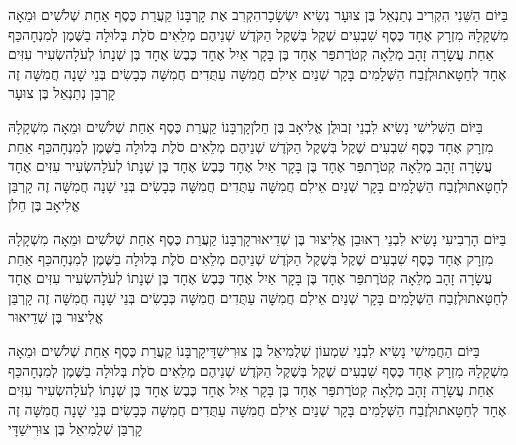 \documentclass[../main/main.tex]{subfiles}
\begin{document}
\begin{multicols}{\ncols}
בַּיּוֹם הַשֵּׁנִי הִקְרִיב נְתַנְאֵל בֶּן צוּעָר נְשִׂיא יִשְׂשָׂכָר\PreVerseSpace{}הִקְרִב אֶת קָרְבָּנוֹ קַעֲרַת כֶּסֶף אַחַת שְׁלֹשִׁים וּמֵאָה מִשְׁקָלָהּ מִזְרָק אֶחָד כֶּסֶף שִׁבְעִים שֶׁקֶל בְּשֶׁקֶל הַקֹּדֶשׁ שְׁנֵיהֶם מְלֵאִים סֹלֶת בְּלוּלָה בַשֶּׁמֶן לְמִנְחָה\PreVerseSpace{}כַּף אַחַת עֲשָׂרָה זָהָב מְלֵאָה קְטֹרֶת\PreVerseSpace{}פַּר אֶחָד בֶּן בָּקָר אַיִל אֶחָד כֶּבֶשׂ אֶחָד בֶּן שְׁנָתוֹ לְעֹלָה\PreVerseSpace{}שְׂעִיר עִזִּים אֶחָד לְחַטָּאת\PreVerseSpace{}וּלְזֶבַח הַשְּׁלָמִים בָּקָר שְׁנַיִם אֵילִם חֲמִשָּׁה עַתֻּדִים חֲמִשָּׁה כְּבָשִׂים בְּנֵי שָׁנָה חֲמִשָּׁה זֶה קָרְבַּן נְתַנְאֵל בֶּן צוּעָר\OpenSection{}\par
{}בַּיּוֹם הַשְּׁלִישִׁי נָשִׂיא לִבְנֵי זְבוּלֻן אֱלִיאָב בֶּן חֵלֹן\PreVerseSpace{}קָרְבָּנוֹ קַעֲרַת כֶּסֶף אַחַת שְׁלֹשִׁים וּמֵאָה מִשְׁקָלָהּ מִזְרָק אֶחָד כֶּסֶף שִׁבְעִים שֶׁקֶל בְּשֶׁקֶל הַקֹּדֶשׁ שְׁנֵיהֶם מְלֵאִים סֹלֶת בְּלוּלָה בַשֶּׁמֶן לְמִנְחָה\PreVerseSpace{}כַּף אַחַת עֲשָׂרָה זָהָב מְלֵאָה קְטֹרֶת\PreVerseSpace{}פַּר אֶחָד בֶּן בָּקָר אַיִל אֶחָד כֶּבֶשׂ אֶחָד בֶּן שְׁנָתוֹ לְעֹלָה\PreVerseSpace{}שְׂעִיר עִזִּים אֶחָד לְחַטָּאת\PreVerseSpace{}וּלְזֶבַח הַשְּׁלָמִים בָּקָר שְׁנַיִם אֵילִם חֲמִשָּׁה עַתֻּדִים חֲמִשָּׁה כְּבָשִׂים בְּנֵי שָׁנָה חֲמִשָּׁה זֶה קָרְבַּן אֱלִיאָב בֶּן חֵלֹן\OpenSection{}\par
{}בַּיּוֹם הָרְבִיעִי נָשִׂיא לִבְנֵי רְאוּבֵן אֱלִיצוּר בֶּן שְׁדֵיאוּר\PreVerseSpace{}קָרְבָּנוֹ קַעֲרַת כֶּסֶף אַחַת שְׁלֹשִׁים וּמֵאָה מִשְׁקָלָהּ מִזְרָק אֶחָד כֶּסֶף שִׁבְעִים שֶׁקֶל בְּשֶׁקֶל הַקֹּדֶשׁ שְׁנֵיהֶם מְלֵאִים סֹלֶת בְּלוּלָה בַשֶּׁמֶן לְמִנְחָה\PreVerseSpace{}כַּף אַחַת עֲשָׂרָה זָהָב מְלֵאָה קְטֹרֶת\PreVerseSpace{}פַּר אֶחָד בֶּן בָּקָר אַיִל אֶחָד כֶּבֶשׂ אֶחָד בֶּן שְׁנָתוֹ לְעֹלָה\PreVerseSpace{}שְׂעִיר עִזִּים אֶחָד לְחַטָּאת\PreVerseSpace{}וּלְזֶבַח הַשְּׁלָמִים בָּקָר שְׁנַיִם אֵילִם חֲמִשָּׁה עַתֻּדִים חֲמִשָּׁה כְּבָשִׂים בְּנֵי שָׁנָה חֲמִשָּׁה זֶה קָרְבַּן אֱלִיצוּר בֶּן שְׁדֵיאוּר\OpenSection{}\par
{}בַּיּוֹם הַחֲמִישִׁי נָשִׂיא לִבְנֵי שִׁמְעוֹן שְׁלֻמִיאֵל בֶּן צוּרִישַׁדָּי\PreVerseSpace{}קָרְבָּנוֹ קַעֲרַת כֶּסֶף אַחַת שְׁלֹשִׁים וּמֵאָה מִשְׁקָלָהּ מִזְרָק אֶחָד כֶּסֶף שִׁבְעִים שֶׁקֶל בְּשֶׁקֶל הַקֹּדֶשׁ שְׁנֵיהֶם מְלֵאִים סֹלֶת בְּלוּלָה בַשֶּׁמֶן לְמִנְחָה\PreVerseSpace{}כַּף אַחַת עֲשָׂרָה זָהָב מְלֵאָה קְטֹרֶת\PreVerseSpace{}פַּר אֶחָד בֶּן בָּקָר אַיִל אֶחָד כֶּבֶשׂ אֶחָד בֶּן שְׁנָתוֹ לְעֹלָה\PreVerseSpace{}שְׂעִיר עִזִּים אֶחָד לְחַטָּאת\PreVerseSpace{}וּלְזֶבַח הַשְּׁלָמִים בָּקָר שְׁנַיִם אֵילִם חֲמִשָּׁה עַתֻּדִים חֲמִשָּׁה כְּבָשִׂים בְּנֵי שָׁנָה חֲמִשָּׁה זֶה קָרְבַּן שְׁלֻמִיאֵל בֶּן צוּרִישַׁדָּי\OpenSection{}\par

\end{multicols}
\end{document}
